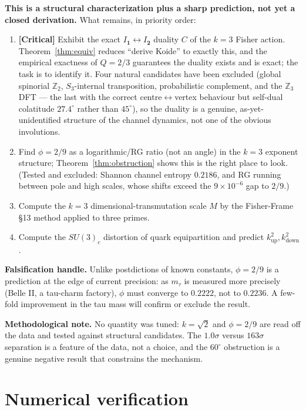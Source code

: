 \documentclass[12pt]{article}
\theoremstyle{definition}
\theoremstyle{remark}
\begin{document}
\medskip\noindent\textbf{This is a structural characterization plus a sharp
prediction, not yet a closed derivation.} What remains, in priority order:
\begin{enumerate}
\item \textbf{[Critical]} Exhibit the exact $I_{\mathbf 1}\leftrightarrow
I_{\mathbf 2}$ duality $C$ of the $k=3$ Fisher action.
Theorem~\ref{thm:equiv} reduces ``derive Koide'' to exactly this, and the
empirical exactness of $Q=2/3$ guarantees the duality exists and is exact; the
task is to identify it. Four natural candidates have been excluded (global
spinorial $\mathbb{Z}_2$, $S_3$-internal transposition, probabilistic
complement, and the $\mathbb{Z}_3$ DFT --- the last with the correct
centre$\leftrightarrow$vertex behaviour but self-dual colatitude $27.4^\circ$
rather than $45^\circ$), so the duality is a genuine, as-yet-unidentified
structure of the channel dynamics, not one of the obvious involutions.
\item Find $\phi=2/9$ as a logarithmic/RG ratio (not an angle) in the $k=3$
exponent structure; Theorem~\ref{thm:obstruction} shows this is the right
place to look. (Tested and excluded: Shannon channel entropy $0.2186$, and
RG running between pole and high scales, whose shifts exceed the $9\times
10^{-6}$ gap to $2/9$.)
\item Compute the $k=3$ dimensional-transmutation scale $M$ by the
Fisher-Frame \S13 method applied to three primes.
\item Compute the $SU(3)_c$ distortion of quark equipartition and predict
$k^2_{\mathrm{up}},k^2_{\mathrm{down}}$.
\end{enumerate}

\medskip\noindent\textbf{Falsification handle.} Unlike postdictions of known
constants, $\phi=2/9$ is a prediction at the edge of current precision: as
$m_\tau$ is measured more precisely (Belle II, a tau-charm factory), $\phi$
must converge to $0.2222$, not to $0.2236$. A few-fold improvement in the tau
mass will confirm or exclude the result.

\medskip\noindent\textbf{Methodological note.} No quantity was tuned: $k=\sqrt2$
and $\phi=2/9$ are read off the data and tested against structural candidates.
The $1.0\sigma$ versus $163\sigma$ separation is a feature of the data, not a
choice, and the $60^\circ$ obstruction is a genuine negative result that
constrains the mechanism.

\appendix
\section{Numerical verification}
\end{document}
